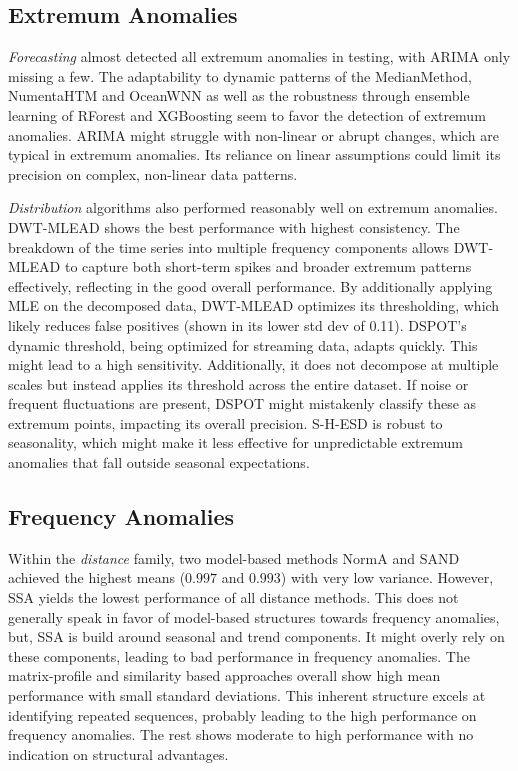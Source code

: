 \subsection{Extremum Anomalies} 
    
    \textit{Forecasting} almost detected all extremum anomalies in testing, with ARIMA only missing a few.
    The adaptability to dynamic patterns of the MedianMethod, NumentaHTM and OceanWNN as well as the robustness through ensemble learning of RForest and XGBoosting seem to favor the detection of extremum anomalies. 
    ARIMA might struggle with non-linear or abrupt changes, which are typical in extremum anomalies. Its reliance on linear assumptions could limit its precision on complex, non-linear data patterns.
    
    \textit{Distribution} algorithms also performed reasonably well on extremum anomalies. DWT-MLEAD shows the best performance with highest consistency. The breakdown of the time series into multiple frequency components allows DWT-MLEAD to capture both short-term spikes and broader extremum patterns effectively, reflecting in the good overall performance. By additionally applying MLE on the decomposed data, DWT-MLEAD optimizes its thresholding, which likely reduces false positives (shown in its lower std dev of 0.11).
    DSPOT's dynamic threshold, being optimized for streaming data, adapts quickly. This might lead to a high sensitivity. Additionally, it does not decompose at multiple scales but instead applies its threshold across the entire dataset. If noise or frequent fluctuations are present, DSPOT might mistakenly classify these as extremum points, impacting its overall precision.
    S-H-ESD is robust to seasonality, which might make it less effective for unpredictable extremum anomalies that fall outside seasonal expectations.

\subsection{Frequency Anomalies}
    
    Within the \textit{distance} family, two model-based methods NormA and SAND achieved the highest means ($0.997$ and $0.993$) with very low variance. However, SSA yields the lowest performance of all distance methods. This does not generally speak in favor of model-based structures towards frequency anomalies, but, SSA is build around seasonal and trend components. It might overly rely on these components, leading to bad performance in frequency anomalies.
    The matrix-profile and similarity based approaches overall show high mean performance with small standard deviations. This inherent structure excels at identifying repeated sequences, probably leading to the high performance on frequency anomalies.
    The rest shows moderate to high performance with no indication on structural advantages.
    
